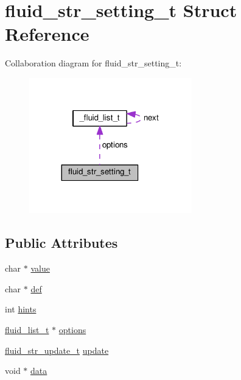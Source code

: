\hypertarget{structfluid__str__setting__t}{}\section{fluid\+\_\+str\+\_\+setting\+\_\+t Struct Reference}
\label{structfluid__str__setting__t}


Collaboration diagram for fluid\+\_\+str\+\_\+setting\+\_\+t\+:
\nopagebreak
\begin{figure}[H]
\begin{center}
\leavevmode
\includegraphics[width=200pt]{structfluid__str__setting__t__coll__graph}
\end{center}
\end{figure}
\subsection*{Public Attributes}
\begin{DoxyCompactItemize}
\item 
char $\ast$ \hyperlink{structfluid__str__setting__t_a216a63997a2b5d7d189413eed6fb75e8}{value}
\item 
char $\ast$ \hyperlink{structfluid__str__setting__t_a647bd0ffc7f66204fb98da98e2e59678}{def}
\item 
int \hyperlink{structfluid__str__setting__t_a90b54a14eda217dae493e040479c641f}{hints}
\item 
\hyperlink{fluid__list_8h_a3ef7535d4290862c0af118569223bd89}{fluid\+\_\+list\+\_\+t} $\ast$ \hyperlink{structfluid__str__setting__t_a832b8230e29be539ff76c202656a4d6f}{options}
\item 
\hyperlink{fluid__settings_8h_a7a2ee5199ed26bcf570403bdc08b0cbb}{fluid\+\_\+str\+\_\+update\+\_\+t} \hyperlink{structfluid__str__setting__t_a55e8b96eeaaf9d6dd392fbe0b123c698}{update}
\item 
void $\ast$ \hyperlink{structfluid__str__setting__t_a1a9d07219c6da4f952bbeb63ba0a0805}{data}
\end{DoxyCompactItemize}



